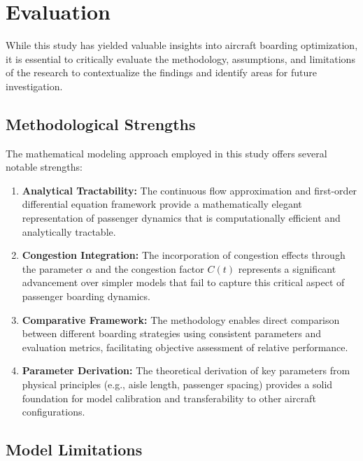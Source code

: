 
\section{Evaluation}

While this study has yielded valuable insights into aircraft boarding optimization, it is essential to critically evaluate the methodology, assumptions, and limitations of the research to contextualize the findings and identify areas for future investigation.

\subsection{Methodological Strengths}

The mathematical modeling approach employed in this study offers several notable strengths:

\begin{enumerate}
    \item \textbf{Analytical Tractability:} The continuous flow approximation and first-order differential equation framework provide a mathematically elegant representation of passenger dynamics that is computationally efficient and analytically tractable.
    
    \item \textbf{Congestion Integration:} The incorporation of congestion effects through the parameter $\alpha$ and the congestion factor $C(t)$ represents a significant advancement over simpler models that fail to capture this critical aspect of passenger boarding dynamics.
    
    \item \textbf{Comparative Framework:} The methodology enables direct comparison between different boarding strategies using consistent parameters and evaluation metrics, facilitating objective assessment of relative performance.
    
    \item \textbf{Parameter Derivation:} The theoretical derivation of key parameters from physical principles (e.g., aisle length, passenger spacing) provides a solid foundation for model calibration and transferability to other aircraft configurations.
\end{enumerate}

\subsection{Model Limitations}

